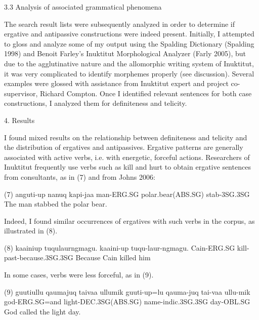 \documentclass[12pt]{article}
\begin{document}
3.3 Analysis of associated grammatical phenomena 

The search result lists were subsequently analyzed in order to determine if ergative and antipassive constructions were indeed present. Initially, I attempted to gloss and analyze some of my  output using the Spalding Dictionary (Spalding 1998) and Benoit Farley’s Inuktitut Morphological Analyzer (Farly 2005), but due to the agglutinative nature and the allomorphic writing system of Inuktitut, it was very complicated to identify morphemes properly (see discussion). Several examples were glossed with assistance from Inuktitut expert and project co-supervisor, Richard Compton. Once I identified relevant sentences for both case constructions, I analyzed them for definiteness and telicity.

4. Results

I found mixed results on the relationship between definiteness and telicity and the distribution of ergatives and antipassives. Ergative patterns are generally associated with active verbs, i.e. with energetic, forceful actions. Researchers of Inuktitut frequently use verbs such as kill and hurt to obtain ergative sentences from consultants, as in (7) and from Johns 2006:

(7) anguti-up         nanuq                        kapi-jaa
      man-ERG.SG  polar.bear(ABS.SG) stab-3SG.3SG
	      The man stabbed the polar bear.

Indeed, I found similar occurrences of ergatives with such verbs in the corpus, as illustrated in (8). 

(8) kaainiup           tuqulaurngmagu.
      kaaini-up         tuqu-laur-ngmagu.
      Cain-ERG.SG kill-past-because.3SG.3SG 
      Because Cain killed him

In some cases, verbs were less forceful, as in (9).

(9) guutiullu                 qaumajuq                          taivaa                          ullumik
      guuti-up=lu            qauma-juq                         tai-vaa                         ullu-mik
                  god-ERG.SG=and light-DEC.3SG(ABS.SG) name-indic.3SG.3SG day-OBL.SG
	      God called the light day.
\end{document}
